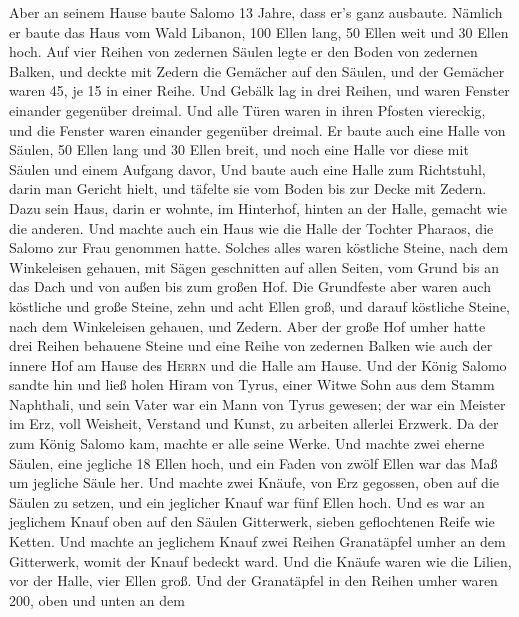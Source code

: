 Aber an seinem Hause baute Salomo 13 Jahre, dass er's
ganz ausbaute.  Nämlich er baute das Haus vom Wald
Libanon, 100 Ellen lang, 50 Ellen weit und 30 Ellen hoch. Auf vier
Reihen von zedernen Säulen legte er den Boden von zedernen Balken,
 und deckte mit Zedern die Gemächer auf den Säulen, und
der Gemächer waren 45, je 15 in einer Reihe.  Und Gebälk
lag in drei Reihen, und waren Fenster einander gegenüber dreimal.
 Und alle Türen waren in ihren Pfosten viereckig, und die
Fenster waren einander gegenüber dreimal.  Er baute auch
eine Halle von Säulen, 50 Ellen lang und 30 Ellen breit, und noch eine
Halle vor diese mit Säulen und einem Aufgang davor,  Und
baute auch eine Halle zum Richtstuhl, darin man Gericht hielt, und
täfelte sie vom Boden bis zur Decke mit Zedern.  Dazu sein
Haus, darin er wohnte, im Hinterhof, hinten an der Halle, gemacht wie
die anderen. Und machte auch ein Haus wie die Halle der Tochter Pharaos,
die Salomo zur Frau genommen hatte.  Solches alles waren
köstliche Steine, nach dem Winkeleisen gehauen, mit Sägen geschnitten
auf allen Seiten, vom Grund bis an das Dach und von außen bis zum großen
Hof.  Die Grundfeste aber waren auch köstliche und große
Steine, zehn und acht Ellen groß,  und darauf köstliche
Steine, nach dem Winkeleisen gehauen, und Zedern.  Aber
der große Hof umher hatte drei Reihen behauene Steine und eine Reihe von
zedernen Balken wie auch der innere Hof am Hause des \textsc{Herrn} und
die Halle am Hause.  Und der König Salomo sandte hin und
ließ holen Hiram von Tyrus,  einer Witwe Sohn aus dem
Stamm Naphthali, und sein Vater war ein Mann von Tyrus gewesen; der war
ein Meister im Erz, voll Weisheit, Verstand und Kunst, zu arbeiten
allerlei Erzwerk. Da der zum König Salomo kam, machte er alle seine
Werke.  Und machte zwei eherne Säulen, eine jegliche 18
Ellen hoch, und ein Faden von zwölf Ellen war das Maß um jegliche Säule
her.  Und machte zwei Knäufe, von Erz gegossen, oben auf
die Säulen zu setzen, und ein jeglicher Knauf war fünf Ellen hoch.
 Und es war an jeglichem Knauf oben auf den Säulen
Gitterwerk, sieben geflochtenen Reife wie Ketten.  Und
machte an jeglichem Knauf zwei Reihen Granatäpfel umher an dem
Gitterwerk, womit der Knauf bedeckt ward.  Und die Knäufe
waren wie die Lilien, vor der Halle, vier Ellen groß. 
Und der Granatäpfel in den Reihen umher waren 200, oben und unten an dem
